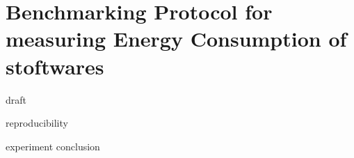 \newpage
\label{chapter:benchmarking}
\chapter{Benchmarking Protocol for measuring Energy Consumption of stoftwares}

{draft}

{reproducibility}

{experiment}
{conclusion}




